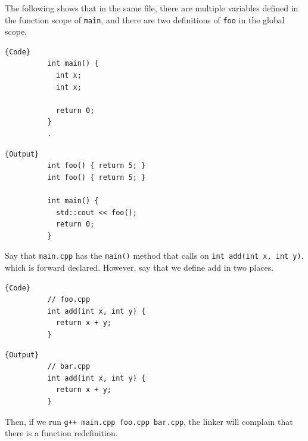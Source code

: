 \documentclass{article}
\newcounter{definition}[section]
\newcounter{example}[section]
\begin{document}
    \begin{example}
      \label{ex:odr-1-violation}
 
      The following shows that in the same file, there are multiple variables defined in the function scope of \texttt{main}, and there are two definitions of \texttt{foo} in the global scope. 
      
      \noindent\begin{minipage}{.5\textwidth}
        \begin{lstlisting}[]{Code}
          int main() {
            int x; 
            int x;

            return 0;
          } 
          .
        \end{lstlisting}
        \end{minipage}
        \hfill
        \begin{minipage}{.49\textwidth}
        \begin{lstlisting}[]{Output}
          int foo() { return 5; }
          int foo() { return 5; }

          int main() {
            std::cout << foo();
            return 0;
          } 
        \end{lstlisting}
      \end{minipage}
    \end{example}

    \begin{example}
      \label{ex:odr-2-violation}
      Say that \texttt{main.cpp} has the \texttt{main()} method that calls on \texttt{int add(int x, int y)}, which is forward declared. However, say that we define add in two places. 

      \noindent\begin{minipage}{.5\textwidth}
        \begin{lstlisting}[]{Code}
          // foo.cpp 
          int add(int x, int y) {
            return x + y; 
          }
        \end{lstlisting}
        \end{minipage}
        \hfill
        \begin{minipage}{.49\textwidth}
        \begin{lstlisting}[]{Output}
          // bar.cpp 
          int add(int x, int y) {
            return x + y; 
          }
        \end{lstlisting}
      \end{minipage}
      Then, if we run \texttt{g++ main.cpp foo.cpp bar.cpp}, the linker will complain that there is a function redefinition. 
    \end{example}
\end{document}
